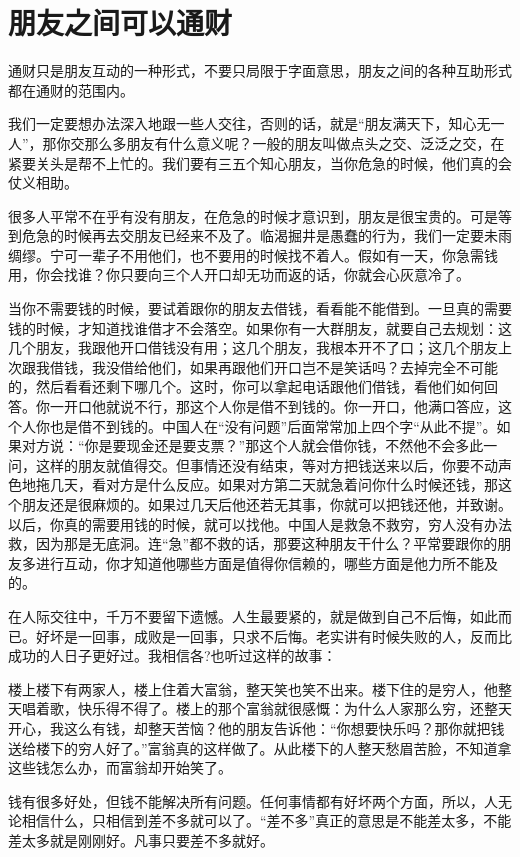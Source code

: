 \documentclass[fontset=fandol, a4paper, 12pt, openright]{ctexbook}
\begin{document}
\section{朋友之间可以通财}

通财只是朋友互动的一种形式，不要只局限于字面意思，朋友之间的各种互助形式都在通财的范围内。

我们一定要想办法深入地跟一些人交往，否则的话，就是“朋友满天下，知心无一人”，那你交那么多朋友有什么意义呢？一般的朋友叫做点头之交、泛泛之交，在紧要关头是帮不上忙的。我们要有三五个知心朋友，当你危急的时候，他们真的会仗义相助。

很多人平常不在乎有没有朋友，在危急的时候才意识到，朋友是很宝贵的。可是等到危急的时候再去交朋友已经来不及了。临渴掘井是愚蠢的行为，我们一定要未雨绸缪。宁可一辈子不用他们，也不要用的时候找不着人。假如有一天，你急需钱用，你会找谁？你只要向三个人开口却无功而返的话，你就会心灰意冷了。

当你不需要钱的时候，要试着跟你的朋友去借钱，看看能不能借到。一旦真的需要钱的时候，才知道找谁借才不会落空。如果你有一大群朋友，就要自己去规划：这几个朋友，我跟他开口借钱没有用；这几个朋友，我根本开不了口；这几个朋友上次跟我借钱，我没借给他们，如果再跟他们开口岂不是笑话吗？去掉完全不可能的，然后看看还剩下哪几个。这时，你可以拿起电话跟他们借钱，看他们如何回答。你一开口他就说不行，那这个人你是借不到钱的。你一开口，他满口答应，这个人你也是借不到钱的。中国人在“没有问题”后面常常加上四个字“从此不提”。如果对方说：“你是要现金还是要支票？”那这个人就会借你钱，不然他不会多此一问，这样的朋友就值得交。但事情还没有结束，等对方把钱送来以后，你要不动声色地拖几天，看对方是什么反应。如果对方第二天就急着问你什么时候还钱，那这个朋友还是很麻烦的。如果过几天后他还若无其事，你就可以把钱还他，并致谢。以后，你真的需要用钱的时候，就可以找他。中国人是救急不救穷，穷人没有办法救，因为那是无底洞。连“急”都不救的话，那要这种朋友干什么？平常要跟你的朋友多进行互动，你才知道他哪些方面是值得你信赖的，哪些方面是他力所不能及的。

在人际交往中，千万不要留下遗憾。人生最要紧的，就是做到自己不后悔，如此而已。好坏是一回事，成败是一回事，只求不后悔。老实讲有时候失败的人，反而比成功的人日子更好过。我相信各?也听过这样的故事：

楼上楼下有两家人，楼上住着大富翁，整天笑也笑不出来。楼下住的是穷人，他整天唱着歌，快乐得不得了。楼上的那个富翁就很感慨：为什么人家那么穷，还整天开心，我这么有钱，却整天苦恼？他的朋友告诉他：“你想要快乐吗？那你就把钱送给楼下的穷人好了。”富翁真的这样做了。从此楼下的人整天愁眉苦脸，不知道拿这些钱怎么办，而富翁却开始笑了。

钱有很多好处，但钱不能解决所有问题。任何事情都有好坏两个方面，所以，人无论相信什么，只相信到差不多就可以了。“差不多”真正的意思是不能差太多，不能差太多就是刚刚好。凡事只要差不多就好。
\end{document}
